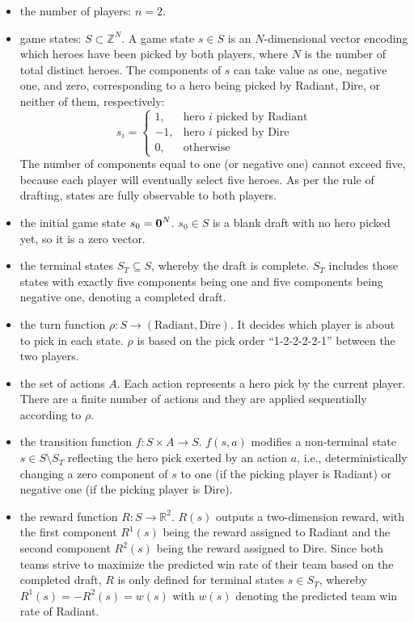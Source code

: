 \begin{itemize}
\item the number of players: $n = 2$.
\item game states: $S \subset \mathbb{Z}^{N}$. A game state $s \in S$ is an $N$-dimensional vector encoding which heroes have been picked by both players, where $N$ is the number of total distinct heroes. The components of $s$ can take value as one, negative one, and zero, corresponding to a hero being picked by Radiant, Dire, or neither of them, respectively:
\begin{equation}
s_{i}=
\begin{cases}
  1, & \text{hero } i \text{ picked by Radiant} \\
  -1, & \text{hero } i \text{ picked by Dire} \\
  0, & \text{otherwise}
\end{cases}
\label{eqn:sifeature}
\end{equation}
The number of components equal to one (or negative one) cannot exceed five, because each player will eventually select five heroes. As per the rule of drafting, states are fully observable to both players. 
\item the initial game state $s_0 = \boldsymbol{0}^N$. $s_0 \in S$ is a blank draft with no hero picked yet, so it is a zero vector. 
\item the terminal states $S_T \subseteq S$, whereby the draft is complete. $S_T$ includes those states with exactly five components being one and five components being negative one, denoting a completed draft.
\item the turn function $\rho: S \rightarrow (\text{Radiant}, \text{Dire})$. It decides which player is about to pick in each state. $\rho$ is based on the pick order ``1-2-2-2-2-1'' between the two players.   
\item the set of actions $A$. Each action represents a hero pick by the current player. There are a finite number of actions and they are applied sequentially according to $\rho$. 
\item the transition function $f: S \times A \rightarrow S$. $f(s,a)$ modifies a non-terminal state $s \in S \setminus S_T$ reflecting the hero pick exerted by an action $a$, i.e., deterministically changing a zero component of $s$ to one (if the picking player is Radiant) or negative one (if the picking player is Dire).
\item the reward function $R: S \rightarrow \mathbb{R}^2$. $R(s)$ outputs a two-dimension reward, with the first component $R^1(s)$ being the reward assigned to Radiant and the second component $R^2(s)$ being the reward assigned to Dire. Since both teams strive to maximize the predicted win rate of their team based on the completed draft, $R$ is only defined for terminal states $s \in S_T$, whereby $R^1(s)=-R^2(s)=w(s)$ with $w(s)$ denoting the predicted team win rate of Radiant. 
\end{itemize}

